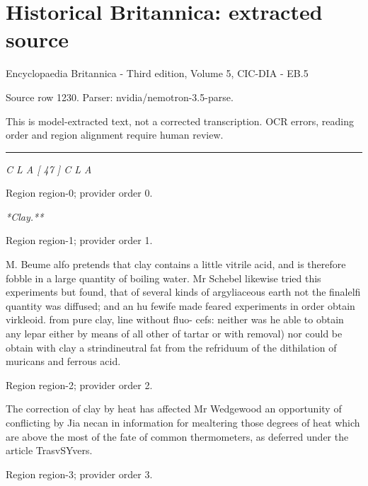 \documentclass[11pt]{article}
\begin{document}
\section*{Historical Britannica: extracted source}
Encyclopaedia Britannica - Third edition, Volume 5, CIC-DIA - EB.5\par
{\small Source row 1230. Parser: nvidia/nemotron-3.5-parse.\par}
{\small This is model-extracted text, not a corrected transcription. OCR errors, reading order and region alignment require human review.\par}
\hrule\medskip
{\small\itshape C L A [ 47 ] C L A\par}

{\scriptsize\color{gray} Region region-0; provider order 0.\par}
\medskip

{\small\itshape **Clay.**\par}

{\scriptsize\color{gray} Region region-1; provider order 1.\par}
\medskip

M. Beume alfo pretends that clay contains a little vitrile acid, and is therefore fobble in a large quantity of boiling water. Mr Schebel likewise tried this experiments but found, that of several kinds of argyliaceous earth not the finalelfi quantity was diffused; and an hu fewife made feared experiments in order obtain virkleoid. from pure clay, line without fluo- cefs: neither was he able to obtain any lepar either by means of all other of tartar or with removal) nor could be obtain with clay a strindineutral fat from the refriduum of the dithilation of muricans and ferrous acid.
\par

{\scriptsize\color{gray} Region region-2; provider order 2.\par}
\medskip

The correction of clay by heat has affected Mr Wedgewood an opportunity of conflicting by Jia necan in information for mealtering those degrees of heat which are above the most of the fate of common thermometers, as deferred under the article TrasvSYvers.
\par

{\scriptsize\color{gray} Region region-3; provider order 3.\par}
\medskip
\end{document}
